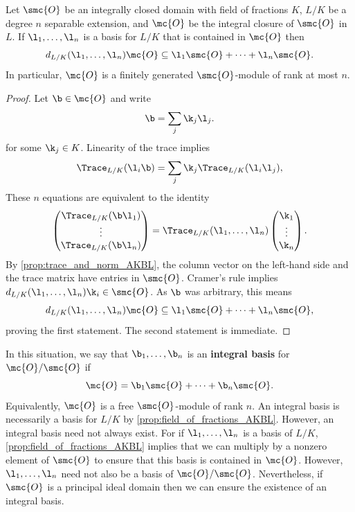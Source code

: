 \documentclass[12pt]{article}
\begin{document}
      \begin{lemma}\label{lem:lemma_for_integral_basis_AKBL}
        Let \(\smc{O}\) be an integrally closed domain with field of fractions \(K\), \(L/K\) be a degree \(n\) separable extension, and \(\mc{O}\) be the integral closure of \(\smc{O}\) in \(L\). If \(\l_{1},\ldots,\l_{n}\) is a basis for \(L/K\) that is contained in \(\mc{O}\) then
        \[
          d_{L/K}(\l_{1},\ldots,\l_{n})\mc{O} \subseteq \l_{1}\smc{O}+\cdots+\l_{n}\smc{O}.
        \]
        In particular, \(\mc{O}\) is a finitely generated \(\smc{O}\)-module of rank at most \(n\).
      \end{lemma}
      \begin{proof}
        Let \(\b \in \mc{O}\) and write
        \[
          \b =  \sum_{j}\k_{j}\l_{j}.
        \]
        for some \(\k_{j} \in K\). Linearity of the trace implies
        \[
          \Trace_{L/K}(\l_{i}\b) = \sum_{j}\k_{j}\Trace_{L/K}(\l_{i}\l_{j}),
        \]
        These \(n\) equations are equivalent to the identity
        \[
          \begin{pmatrix} \Trace_{L/K}(\b\l_{1}) \\ \vdots \\ \Trace_{L/K}(\b\l_{n}) \end{pmatrix} = \Trace_{L/K}(\l_{1},\ldots,\l_{n})\begin{pmatrix} \k_{1} \\ \vdots \\ \k_{n} \end{pmatrix}.
        \]
        By \cref{prop:trace_and_norm_AKBL}, the column vector on the left-hand side and the trace matrix have entries in \(\smc{O}\). Cramer's rule implies \(d_{L/K}(\l_{1},\ldots,\l_{n})\k_{i} \in \smc{O}\). As \(\b\) was arbitrary, this means
        \[
          d_{L/K}(\l_{1},\ldots,\l_{n})\mc{O} \subseteq \l_{1}\smc{O}+\cdots+\l_{n}\smc{O},
        \]
        proving the first statement. The second statement is immediate.
      \end{proof}

      In this situation, we say that \(\b_{1},\ldots,\b_{n}\) is an \textbf{integral basis} for \(\mc{O}/\smc{O}\) if
      \[
        \mc{O} = \b_{1}\smc{O}+\cdots+\b_{n}\smc{O}.
      \]
      Equivalently, \(\mc{O}\) is a free \(\smc{O}\)-module of rank \(n\). An integral basis is necessarily a basis for \(L/K\) by \cref{prop:field_of_fractions_AKBL}. However, an integral basis need not always exist. For if \(\l_{1},\ldots,\l_{n}\) is a basis of \(L/K\), \cref{prop:field_of_fractions_AKBL} implies that we can multiply by a nonzero element of \(\smc{O}\) to ensure that this basis is contained in \(\mc{O}\). However, \(\l_{1},\ldots,\l_{n}\) need not also be a basis of \(\mc{O}/\smc{O}\). Nevertheless, if \(\smc{O}\) is a principal ideal domain then we can ensure the existence of an integral basis.
      
\end{document}
